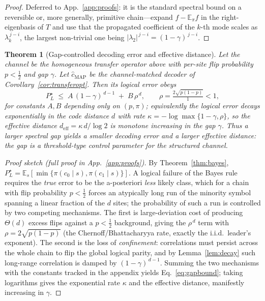 \documentclass[reprint,aps,prxquantum,amsmath,amssymb,floatfix,nofootinbib,longbibliography]{revtex4-2}
\newtheorem{theorem}{Theorem}
\theoremstyle{definition}
\theoremstyle{remark}
\theoremstyle{plain}
\newcommand{\E}{\mathbb{E}}
\newcommand{\abs}[1]{\left\lvert #1 \right\rvert}
\begin{document}
\begin{proof}
Deferred to App.~\ref{app:proofs}: it is the standard spectral bound on a
reversible or, more generally, primitive chain---expand $f-\E_\pi f$ in the
right-eigenbasis of $T$ and use that the propagated coefficient of the
$k$-th mode scales as $\lambda_k^{\,j-i}$, the largest non-trivial one being
$\abs{\lambda_2}^{\,j-i}=(1-\gamma)^{\,j-i}$.
\end{proof}

\begin{theorem}[Gap-controlled decoding error and effective distance]
\label{thm:gapbound}
Let the channel be the homogeneous transfer operator above with per-site flip
probability $p<\tfrac12$ and gap $\gamma$. Let $\hat c_{\mathrm{MAP}}$ be the
channel-matched decoder of Corollary~\ref{cor:transferopt}. Then its logical
error obeys
\begin{equation}
  P_L^\star \;\le\; A\,(1-\gamma)^{\,d-1}\;+\;B\,\rho^{\,d},
  \qquad \rho=\tfrac{2\sqrt{p(1-p)}}{1}<1,
  \label{eq:gapbound}
\end{equation}
for constants $A,B$ depending only on $(p,\pi)$; equivalently the logical error
decays exponentially in the code distance $d$ with rate
$\kappa=-\log\max\{1-\gamma,\rho\}$, so the \emph{effective distance}
$d_{\mathrm{eff}}=\kappa\,d/\log 2$ is monotone increasing in the gap $\gamma$.
Thus a larger spectral gap yields a smaller decoding error and a larger
effective distance: the gap is a threshold-type control parameter for the
structured channel.
\end{theorem}

\begin{proof}[Proof sketch (full proof in App.~\ref{app:proofs})]
By Theorem~\ref{thm:bayes}, $P_L^\star=\E_s[\min\{\pi(c_0\mid s),\pi(c_1\mid
s)\}]$. A logical failure of the Bayes rule requires the \emph{true} error to
be the a-posteriori \emph{less} likely class, which for a chain with flip
probability $p<\tfrac12$ forces an atypically long run of the minority symbol
spanning a linear fraction of the $d$ sites; the probability of such a run is
controlled by two competing mechanisms. The first is large-deviation cost of
producing $\Theta(d)$ excess flips against a $p<\tfrac12$ background, giving the
$\rho^{\,d}$ term with $\rho=2\sqrt{p(1-p)}$ (the Chernoff/Bhattacharyya rate,
exactly the i.i.d.\ leader's exponent). The second is the loss of
\emph{confinement}: correlations must persist across the whole chain to flip
the global logical parity, and by Lemma~\ref{lem:decay} such long-range
correlation is damped by $(1-\gamma)^{\,d-1}$. Summing the two mechanisms with
the constants tracked in the appendix yields Eq.~\eqref{eq:gapbound}; taking
logarithms gives the exponential rate $\kappa$ and the effective distance,
manifestly increasing in $\gamma$.
\end{proof}
\end{document}
